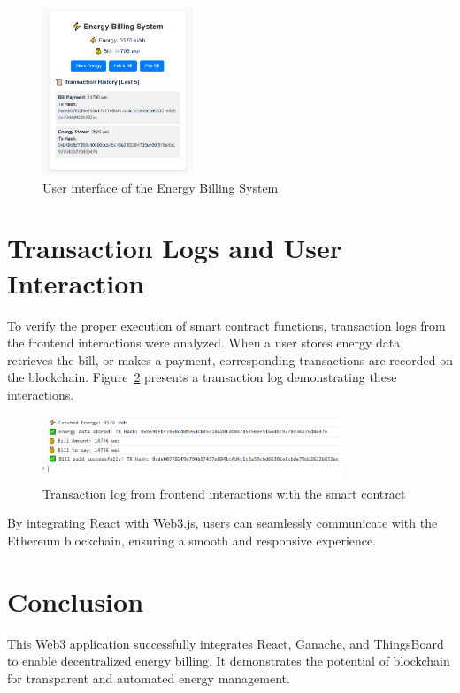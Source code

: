 \documentclass[a4paper,12pt]{report}
\begin{document}
\begin{figure}[H]
\centering
\includegraphics[width=0.4\textwidth]{web3 App.PNG}
\caption{User interface of the Energy Billing System}
\label{fig:frontend_ui}
\end{figure}

\section{Transaction Logs and User Interaction}
To verify the proper execution of smart contract functions, transaction logs from the frontend interactions were analyzed. When a user stores energy data, retrieves the bill, or makes a payment, corresponding transactions are recorded on the blockchain. Figure~\ref{fig:frontend_transactions} presents a transaction log demonstrating these interactions.

\begin{figure}[H]
\centering
\includegraphics[width=0.8\textwidth]{frontend Logs.PNG}
\caption{Transaction log from frontend interactions with the smart contract}
\label{fig:frontend_transactions}
\end{figure}

By integrating React with Web3.js, users can seamlessly communicate with the Ethereum blockchain, ensuring a smooth and responsive experience.
 
 \section{Conclusion}
 This Web3 application successfully integrates React, Ganache, and ThingsBoard to enable decentralized energy billing. It demonstrates the potential of blockchain for transparent and automated energy management.
\end{document}
